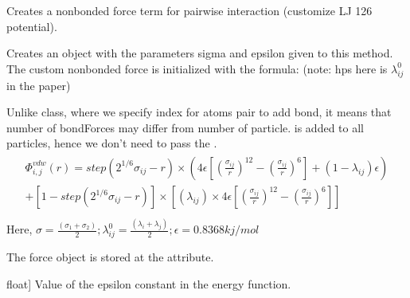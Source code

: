\documentclass[letterpaper,10pt,english]{sphinxmanual}
\begin{document}
\begin{fulllineitems}
\begin{fulllineitems}
\begin{quote}
\begin{description}
\end{description}\end{quote}

\end{fulllineitems}


\begin{fulllineitems}
\label{\detokenize{modules/system:hps.core.system.addAshbaughHatchForces}}
\pysigstartsignatures
{}
\pysigstopsignatures
\sphinxAtStartPar
Creates a nonbonded force term for pairwise interaction (customize LJ 12\sphinxhyphen{}6 potential).

\sphinxAtStartPar
Creates an  object with the parameters
sigma and epsilon given to this method. The custom non\sphinxhyphen{}bonded force
is initialized with the formula: (note: hps here is \(\lambda_{ij}^{0}\) in the paper)

\sphinxAtStartPar
Unlike  class, where we specify index for atoms pair to add bond, it means
that number of bondForces may differ from number of particle.
 is added to all particles, hence we don’t need to pass the .
\begin{align*}\!\begin{aligned}
\Phi_{i,j}^{vdw}(r) = step(2^{1/6}\sigma_{ij}-r) \times
\left( 4\epsilon\left[\left(\frac{\sigma_{ij}}{r}\right)^{12}-
\left(\frac{\sigma_{ij}}{r}\right)^{6}\right]+(1-\lambda_{ij})\epsilon\right)\\
+ \left[1-step(2^{1/6}\sigma_{ij}-r)\right]\times\left[(\lambda_{ij})\times 4\epsilon
\left[\left(\frac{\sigma_{ij}}{r}\right)^{12}-\left(\frac{\sigma_{ij}}{r}\right)^6\right]\right]\\
\end{aligned}\end{align*}
\sphinxAtStartPar
Here, \(\sigma= \frac{(\sigma_1+\sigma_2)}{2}; \lambda_{ij}^{0}=\frac{(\lambda_i+\lambda_j)}{2};
\epsilon = 0.8368 kj/mol\)

\sphinxAtStartPar
The force object is stored at the  attribute.
\begin{description}
\sphinxlineitem{epsilon}{[}float{]}
\sphinxAtStartPar
Value of the epsilon constant in the energy function.


\end{description}
\end{fulllineitems}
\end{fulllineitems}
\end{document}
